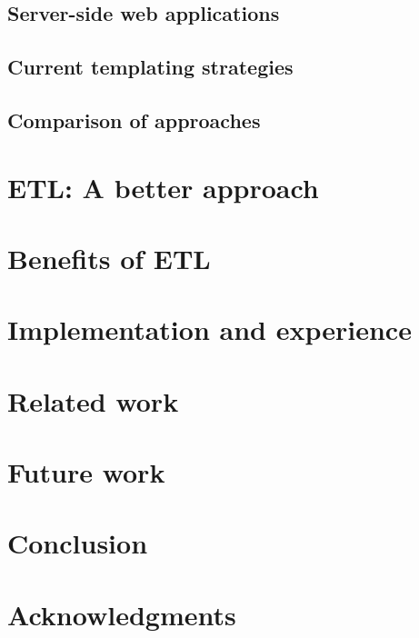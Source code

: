 \documentclass{www2003-submission}
\begin{document}
\subsection{Server-side web applications}

\subsection{Current templating strategies}

\subsection{Comparison of approaches}



\section{ETL: A better approach}


\section{Benefits of ETL}

\section{Implementation and experience}

\section{Related work}


\section{Future work}


\section{Conclusion}

\section{Acknowledgments}



%
\appendix
\end{document}
